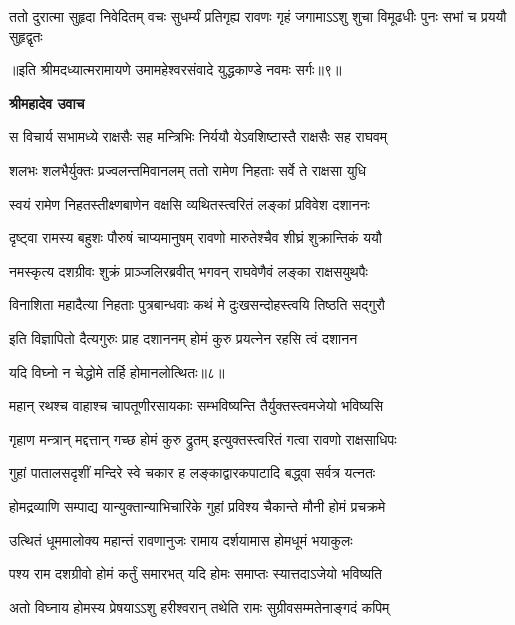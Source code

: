 \fourlineindentedshloka
{ततो दुरात्मा सुहृदा निवेदितम्}
{वचः सुधर्म्यं प्रतिगृह्य रावणः}
{गृहं जगामाऽऽशु शुचा विमूढधीः}
{पुनः सभां च प्रययौ सुहृद्वृतः} %

{॥इति श्रीमदध्यात्मरामायणे उमामहेश्वरसंवादे युद्धकाण्डे नवमः
सर्गः॥९॥
}




\textbf{श्रीमहादेव उवाच}

\twolineshloka
{स विचार्य सभामध्ये राक्षसैः सह मन्त्रिभिः}
{निर्ययौ येऽवशिष्टास्तै राक्षसैः सह राघवम्} %

\twolineshloka
{शलभः शलभैर्युक्तः प्रज्वलन्तमिवानलम्}
{ततो रामेण निहताः सर्वे ते राक्षसा युधि} %

\twolineshloka
{स्वयं रामेण निहतस्तीक्ष्णबाणेन वक्षसि}
{व्यथितस्त्वरितं लङ्कां प्रविवेश दशाननः} %

\twolineshloka
{दृष्ट्वा रामस्य बहुशः पौरुषं चाप्यमानुषम्}
{रावणो मारुतेश्चैव शीघ्रं शुक्रान्तिकं ययौ} %

\twolineshloka
{नमस्कृत्य दशग्रीवः शुक्रं प्राञ्जलिरब्रवीत्}
{भगवन् राघवेणैवं लङ्का राक्षसयुथपैः} %

\twolineshloka
{विनाशिता महादैत्या निहताः पुत्रबान्धवाः}
{कथं मे दुःखसन्दोहस्त्वयि तिष्ठति सद्गुरौ} %

\twolineshloka
{इति विज्ञापितो दैत्यगुरुः प्राह दशाननम्}
{होमं कुरु प्रयत्नेन रहसि त्वं दशानन} %

{यदि विघ्नो न चेद्धोमे तर्हि होमानलोत्थितः॥८॥} %


\twolineshloka
{महान् रथश्च वाहाश्च चापतूणीरसायकाः}
{सम्भविष्यन्ति तैर्युक्तस्त्वमजेयो भविष्यसि} %

\twolineshloka
{गृहाण मन्त्रान् मद्दत्तान् गच्छ होमं कुरु द्रुतम्}
{इत्युक्तस्त्वरितं गत्वा रावणो राक्षसाधिपः} %

\twolineshloka
{गुहां पातालसदृशीं मन्दिरे स्वे चकार ह}
{लङ्काद्वारकपाटादि बद्ध्वा सर्वत्र यत्नतः} %

\twolineshloka
{होमद्रव्याणि सम्पाद्य यान्युक्तान्याभिचारिके}
{गुहां प्रविश्य चैकान्ते मौनी होमं प्रचक्रमे} %

\twolineshloka
{उत्थितं धूममालोक्य महान्तं रावणानुजः}
{रामाय दर्शयामास होमधूमं भयाकुलः} %

\twolineshloka
{पश्य राम दशग्रीवो होमं कर्तुं समारभत्}
{यदि होमः समाप्तः स्यात्तदाऽजेयो भविष्यति} %

\twolineshloka
{अतो विघ्नाय होमस्य प्रेषयाऽऽशु हरीश्वरान्}
{तथेति रामः सुग्रीवसम्मतेनाङ्गदं कपिम्} %

